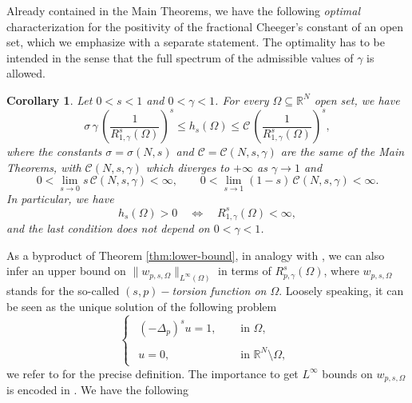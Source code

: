 \documentclass{amsart}
\newtheorem{corollary}[theorem]{Corollary}
\theoremstyle{definition}
\numberwithin{equation}{section}
\begin{document}
	Already contained in the Main Theorems, we have the following {\it optimal} characterization for the positivity of the fractional Cheeger's constant of an open set, which we emphasize with a separate statement. The optimality has to be intended in the sense that the full spectrum of the admissible values of $\gamma$ is allowed. 
	\begin{corollary}
		Let $0 < s <1$ and $0 < \gamma < 1$. For every $\Omega \subseteq \mathbb{R}^N$ open set, we have 
		\[
		\sigma\,\gamma\,\left(\frac{1}{R^s_{1, \gamma}(\Omega)}\right)^s \le h_s(\Omega) \le \mathcal{C}\,\left(\frac{1}{R^s_{1, \gamma}(\Omega)}\right)^s,  
		\] 
		where the constants $\sigma = \sigma\left(N,s\right)$ and $\mathcal{C} = \mathcal{C}\left(N,s,\gamma\right)$ are the same of the Main Theorems, with $\mathcal{C}\left(N,s,\gamma\right)$ which diverges to $+\infty$ as $\gamma \to 1$ and   
		\[
		0 < \lim_{s \to 0} s\,\mathcal{C}\left(N,s,\gamma\right) < \infty, \qquad 0 < \lim_{s \to 1} (1-s)\,\mathcal{C}\left(N,s,\gamma\right) < \infty.
		\]
		In particular, we have 
		\[
		h_s(\Omega) > 0 \quad \Longleftrightarrow \quad R^s_{1, \gamma}(\Omega) < \infty,
		\]
		and the last condition does not depend on $0 < \gamma < 1$. 
	\end{corollary}
	
	As a byproduct of Theorem \ref{thm:lower-bound}, in analogy with \cite[Corollary 2]{BozBra2}, we can also infer an upper bound on $\|w_{p, s, \Omega}\|_{L^\infty(\Omega)}$ in terms of $R^s_{p, \gamma}(\Omega)$, where $w_{p, s, \Omega}$ stands for the so-called {\it $(s,p)-$torsion function on $\Omega$}.  Loosely speaking, it can be seen as the unique solution of the following problem 
	\[
	\begin{cases}
		\begin{aligned}
			(-\Delta_p)^s u = 1, &\quad \mbox{ in } \Omega,\\
			\\
			u = 0, &\quad \mbox{ in } \mathbb{R}^N \setminus \Omega,
		\end{aligned}
	\end{cases}
	\]
	we refer to \cite[Section 3]{franzina-torsion} for the precise definition.	The importance to get $L^\infty$ bounds on $w_{p,s, \Omega}$ is encoded in \cite[Theorem 1.1]{franzina-torsion}. We have the following
	
\end{document}
